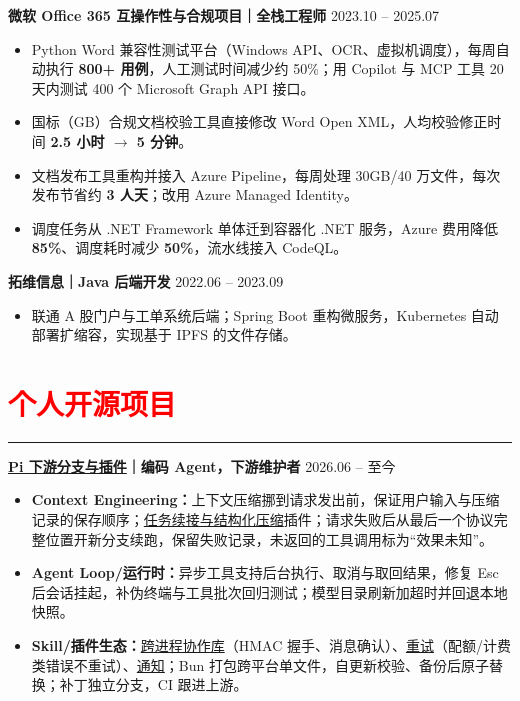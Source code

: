 \documentclass[10pt,a4paper]{article}
\begin{document}
\textbf{微软 Office 365 互操作性与合规项目｜全栈工程师} \hfill 2023.10 -- 2025.07
\begin{itemize}
	\item Python Word 兼容性测试平台（Windows API、OCR、虚拟机调度），每周自动执行 \textbf{800+ 用例}，人工测试时间减少约 50\%；用 Copilot 与 MCP 工具 20 天内测试 400 个 Microsoft Graph API 接口。
	\item 国标（GB）合规文档校验工具直接修改 Word Open XML，人均校验修正时间 \textbf{2.5 小时 $\rightarrow$ 5 分钟}。
	\item 文档发布工具重构并接入 Azure Pipeline，每周处理 30GB/40 万文件，每次发布节省约 \textbf{3 人天}；改用 Azure Managed Identity。
	\item 调度任务从 .NET Framework 单体迁到容器化 .NET 服务，Azure 费用降低 \textbf{85\%}、调度耗时减少 \textbf{50\%}，流水线接入 CodeQL。
\end{itemize}

\textbf{拓维信息｜Java 后端开发} \hfill 2022.06 -- 2023.09
\begin{itemize}
	\item 联通 A 股门户与工单系统后端；Spring Boot 重构微服务，Kubernetes 自动部署扩缩容，实现基于 IPFS 的文件存储。
\end{itemize}

\section*{\textcolor{red}{个人开源项目}}
\vspace*{-4ex}
\noindent\textcolor{red}{\rule{\linewidth}{0.4pt}}
\textbf{\href{https://github.com/xz-dev/pi}{Pi 下游分支与插件}｜编码 Agent，下游维护者} \hfill 2026.06 -- 至今
\begin{itemize}
	\item \textbf{Context Engineering：}上下文压缩挪到请求发出前，保证用户输入与压缩记录的保存顺序；\href{https://github.com/xz-dev/pi-continuity}{任务续接与结构化压缩}插件；请求失败后从最后一个协议完整位置开新分支续跑，保留失败记录，未返回的工具调用标为“效果未知”。
	\item \textbf{Agent Loop/运行时：}异步工具支持后台执行、取消与取回结果，修复 Esc 后会话挂起，补伪终端与工具批次回归测试；模型目录刷新加超时并回退本地快照。
	\item \textbf{Skill/插件生态：}\href{https://github.com/xz-dev/pi-extension-utils}{跨进程协作库}（HMAC 握手、消息确认）、\href{https://github.com/xz-dev/pi-retry}{重试}（配额/计费类错误不重试）、\href{https://github.com/xz-dev/pi-notify}{通知}；Bun 打包跨平台单文件，自更新校验、备份后原子替换；补丁独立分支，CI 跟进上游。
\end{itemize}
\end{document}

